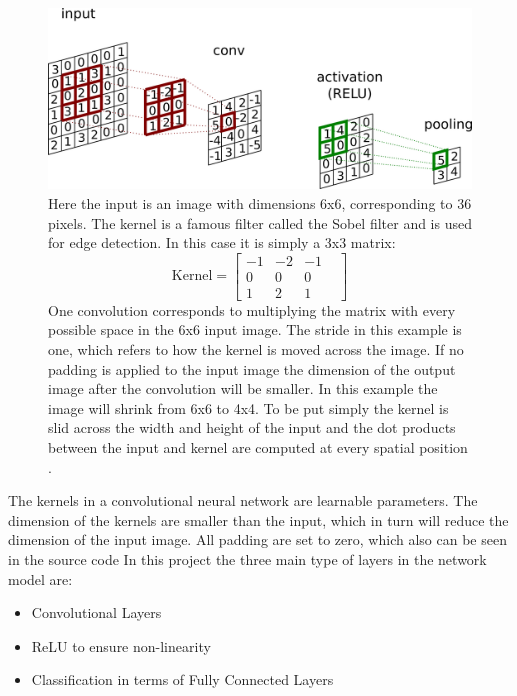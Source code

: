 \documentclass[12pt, fleqn, titlepage]{article}
\newcommand{\1}[1]{\mathds{1}\left[#1\right]}
\begin{document}
	\begin{figure}[H]
		\centering
		\includegraphics[width=0.65\linewidth, trim={0 0 69cm 0},clip]{imgs/convolution}
		\caption{Here the input is an image with dimensions 6x6, corresponding to 36 pixels. The kernel is a famous filter called the Sobel filter and is used for edge detection. In this case it is simply a 3x3 matrix: 
			\[ \text{Kernel} = \begin{bmatrix}
				-1 & -2 & -1 & \\ 0 & 0 & 0 &  \\
				1 & 2 & 1
			\end{bmatrix}  \] 
		One convolution corresponds to multiplying the matrix with every possible space in the 6x6 input image. The stride in this example is one, which refers to how the kernel is moved across the image. If no padding is applied to the input image the dimension of the output image after the convolution will be smaller. In this example the image will shrink from 6x6 to 4x4. To be put simply the kernel is slid across the width and height of the input and the dot products between the input and kernel are computed at every spatial position \cite{cnn_paper}. }
		\label{fig:convolution}
	\end{figure}
	
	The kernels in a convolutional neural network are learnable parameters. The dimension of the kernels are smaller than the input, which in turn will reduce the dimension of the input image. All padding are set to zero, which also can be seen in the source code %
	In this project the three main type of layers in the network model are:

	\begin{itemize}
	\item Convolutional Layers 
	\item ReLU to ensure non-linearity 
	\item Classification in terms of Fully Connected Layers
	\end{itemize}
	
\end{document}
